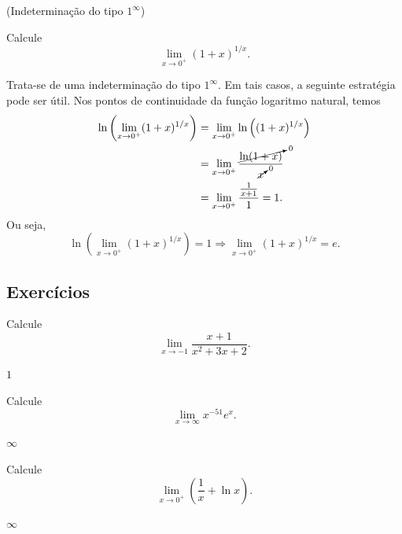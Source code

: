 \begin{exeresol}(Indeterminação do tipo $1^\infty$)

  Calcule
  \begin{equation}
    \lim_{x\to 0^+} (1+x)^{1/x}.
  \end{equation}
\end{exeresol}
\begin{resol}
  Trata-se de uma indeterminação do tipo $1^\infty$. Em tais casos, a seguinte estratégia pode ser útil. Nos pontos de continuidade da função logaritmo natural, temos
  \begin{align}
    \ln\left(\lim_{x\to 0^+} (1+x)^{1/x}\right) &= \lim_{x\to 0^+} \ln\left((1+x)^{1/x}\right) \\
                                                &= \lim_{x\to 0^+} \frac{\cancelto{0}{\ln(1+x)}}{\cancelto{0}{x}} \\
                                                &= \lim_{x\to 0^+} \frac{\frac{1}{x+1}}{1} = 1.
  \end{align}
  Ou seja,
  \begin{equation}
    \ln\left(\lim_{x\to 0^+} (1+x)^{1/x}\right) = 1 \Rightarrow \lim_{x\to 0^+} (1+x)^{1/x} = e.
  \end{equation}
\end{resol}

\subsection*{Exercícios}

\begin{exer}
  Calcule
  \begin{equation}
    \lim_{x\to -1} \frac{x+1}{x^2+3x+2}.
  \end{equation}
\end{exer}
\begin{resp}
  $1$
\end{resp}

\begin{exer}
  Calcule
  \begin{equation}
    \lim_{x\to \infty} x^{-51}e^x.
  \end{equation}
\end{exer}
\begin{resp}
  $\infty$
\end{resp}

\begin{exer}
  Calcule
  \begin{equation}
    \lim_{x\to 0^+} \left(\frac{1}{x}+\ln x\right).
  \end{equation}
\end{exer}
\begin{resp}
  $\infty$
\end{resp}


